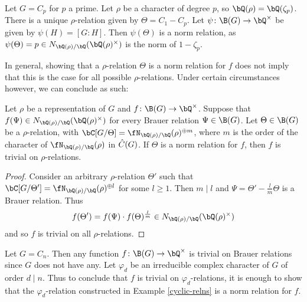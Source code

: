 \begin{example}
    Let $G = C_p$ for $p$ a prime. Let $\rho$ be a character of degree $p$, so $\bQ(\rho) = \bQ(\zeta_p)$. There is a unique $\rho$-relation given by $\Theta = C_1 - C_p$. Let $\psi \colon \B(G) \to \bQ^{\times}$ be given by $\psi(H) = [G \colon H]$. Then $\psi(\Theta)$ is a norm relation, as $\psi(\Theta) = p \in \fieldnorm{\rho}$ is the norm of $1 - \zeta_p$.
\end{example}

In general, showing that a $\rho$-relation $\Theta$ is a norm relation for $f$ does not imply that this is the case for all possible $\rho$-relations. Under certain circumstances however, we can conclude as such:

\begin{prop}\label{min-to-all}
    Let $\rho$ be a representation of $G$ and $f \colon \B(G) \to \bQ^{\times}$. Suppose that $f(\Psi) \in \fieldnorm{\rho}$ for every Brauer relation $\Psi \in \B(G)$. 
    Let $\Theta \in \B(G)$ be a $\rho$-relation, with $\bC[G / \Theta] = \repnorm{\rho}^{\oplus m}$, where $m$ is the order of the character of $\repnorm{\rho}$ in $\hat{C}(G)$. 
    If $\Theta$ is a norm relation for $f$, then $f$ is trivial on $\rho$-relations. 
\end{prop}

\begin{proof}
    Consider an arbitrary $\rho$-relation $\Theta'$ such that $\bC[G / \Theta'] = \repnorm{\rho}^{\oplus l}$ for some $l \geq 1$. Then $m \mid l$ and $\Psi = \Theta' - \frac{l}{m}\Theta$ is a Brauer relation. Thus
    \[ f(\Theta') = f(\Psi)\cdot f(\Theta)^{\frac{l}{m}} \in \fieldnorm{\rho} \]
    and so $f$ is trivial on all $\rho$-relations.
\end{proof}

\begin{example}
    Let $G = C_n$. Then any function $f \colon \B(G) \to \bQ^{\times}$ is trivial on Brauer relations since $G$ does not have any. Let $\varphi_d$ be an irreducible complex character of $G$ of order $d \mid n$. Thus to conclude that $f$ is trivial on $\varphi_d$-relations, it is enough to show that the $\varphi_d$-relation constructed in Example \ref{cyclic-relns} is a norm relation for $f$.
\end{example}


